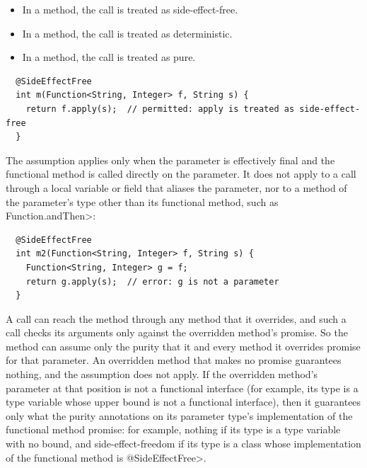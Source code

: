 \begin{itemize}
\item
  In a  method, the call is
  treated as side-effect-free.
\item
  In a  method, the call is
  treated as deterministic.
\item
  In a  method, the call is treated as
  pure.

\end{itemize}

\begin{Verbatim}
  @SideEffectFree
  int m(Function<String, Integer> f, String s) {
    return f.apply(s);  // permitted: apply is treated as side-effect-free
  }
\end{Verbatim}

The assumption applies only when the parameter is effectively final and the
functional method is called directly on the parameter.  It does not apply to a
call through a local variable or field that aliases the parameter, nor to a
method of the parameter's type other than its functional method, such as
\<Function.andThen>:

\begin{Verbatim}
  @SideEffectFree
  int m2(Function<String, Integer> f, String s) {
    Function<String, Integer> g = f;
    return g.apply(s);  // error: g is not a parameter
  }
\end{Verbatim}

A call can reach the method through any method that it overrides, and such a
call checks its arguments only against the overridden method's promise.  So
the method can assume only the purity that it and every method it overrides
promise for that parameter.  An overridden method that makes no promise
guarantees nothing, and the assumption does not apply.  If the overridden
method's parameter at that position is not a functional interface (for
example, its type is a type variable whose upper bound is not a functional
interface), then it guarantees only what the purity annotations on its
parameter type's implementation of the functional method promise:  for
example, nothing if its type is a type variable with no bound, and
side-effect-freedom if its type is a class whose implementation of the
functional method is \<@SideEffectFree>.

